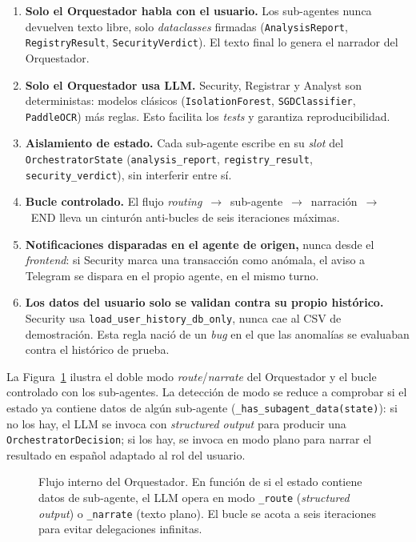 \begin{enumerate}[leftmargin=1.5em,itemsep=0.15em]
  \item \textbf{Solo el Orquestador habla con el usuario.} Los
        sub-agentes nunca devuelven texto libre, solo
        \textit{dataclasses} firmadas (\texttt{AnalysisReport},
        \texttt{RegistryResult}, \texttt{SecurityVerdict}). El texto
        final lo genera el narrador del Orquestador.
  \item \textbf{Solo el Orquestador usa LLM.} Security, Registrar y
        Analyst son deterministas: modelos clásicos
        (\texttt{IsolationForest}, \texttt{SGDClassifier},
        \texttt{PaddleOCR}) más reglas. Esto facilita los \textit{tests}
        y garantiza reproducibilidad.
  \item \textbf{Aislamiento de estado.} Cada sub-agente escribe en su
        \textit{slot} del \texttt{OrchestratorState}
        (\texttt{analysis\_report}, \texttt{registry\_result},
        \texttt{security\_verdict}), sin interferir entre sí.
  \item \textbf{Bucle controlado.} El flujo
        \textit{routing}~$\rightarrow$~sub-agente~$\rightarrow$~narración~$\rightarrow$~END
        lleva un cinturón anti-bucles de seis iteraciones máximas.
  \item \textbf{Notificaciones disparadas en el agente de origen,}
        nunca desde el \textit{frontend}: si Security marca una
        transacción como anómala, el aviso a Telegram se dispara en
        el propio agente, en el mismo turno.
  \item \textbf{Los datos del usuario solo se validan contra su
        propio histórico.} Security usa \texttt{load\_user\_history\_db\_only},
        nunca cae al CSV de demostración. Esta regla nació de un
        \textit{bug} en el que las anomalías se evaluaban contra el
        histórico de prueba.
\end{enumerate}

La Figura~\ref{fig:orchestrator-flow} ilustra el doble modo
\textit{route}/\textit{narrate} del Orquestador y el bucle controlado
con los sub-agentes. La detección de modo se reduce a comprobar si el
estado ya contiene datos de algún sub-agente
(\texttt{\_has\_subagent\_data(state)}): si no los hay, el LLM se
invoca con \textit{structured output} para producir una
\texttt{OrchestratorDecision}; si los hay, se invoca en modo plano
para narrar el resultado en español adaptado al rol del usuario.

\begin{figure}[t]
    \centering
    
    \caption{Flujo interno del Orquestador. En función de si el
    estado contiene datos de sub-agente, el LLM opera en modo
    \texttt{\_route} (\textit{structured output}) o \texttt{\_narrate}
    (texto plano). El bucle se acota a seis iteraciones para evitar
    delegaciones infinitas.}
    \label{fig:orchestrator-flow}
\end{figure}

